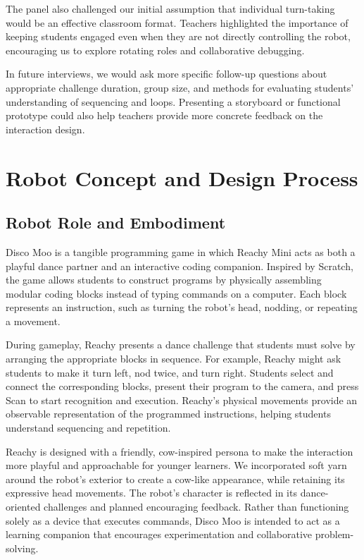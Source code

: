 \documentclass[conference]{IEEEtran}
\begin{document}
The panel also challenged our initial assumption that individual turn-taking would be an effective classroom format. Teachers highlighted the importance of keeping students engaged even when they are not directly controlling the robot, encouraging us to explore rotating roles and collaborative debugging.

In future interviews, we would ask more specific follow-up questions about appropriate challenge duration, group size, and methods for evaluating students' understanding of sequencing and loops. Presenting a storyboard or functional prototype could also help teachers provide more concrete feedback on the interaction design.



\section{Robot Concept and Design Process}

\subsection{Robot Role and Embodiment}

Disco Moo is a tangible programming game in which Reachy Mini acts as both a playful dance partner and an interactive coding companion. Inspired by Scratch, the game allows students to construct programs by physically assembling modular coding blocks instead of typing commands on a computer. Each block represents an instruction, such as turning the robot's head, nodding, or repeating a movement.

During gameplay, Reachy presents a dance challenge that students must solve by arranging the appropriate blocks in sequence. For example, Reachy might ask students to make it turn left, nod twice, and turn right. Students select and connect the corresponding blocks, present their program to the camera, and press Scan to start recognition and execution. Reachy's physical movements provide an observable representation of the programmed instructions, helping students understand sequencing and repetition.

Reachy is designed with a friendly, cow-inspired persona to make the interaction more playful and approachable for younger learners. We incorporated soft yarn around the robot's exterior to create a cow-like appearance, while retaining its expressive head movements. The robot's character is reflected in its dance-oriented challenges and planned encouraging feedback. Rather than functioning solely as a device that executes commands, Disco Moo is intended to act as a learning companion that encourages experimentation and collaborative problem-solving.
\end{document}
